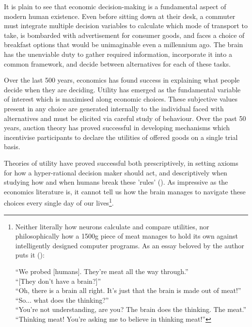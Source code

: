 
\begin{motivation}
It is plain to see that economic decision-making is a fundamental aspect of modern human existence. Even before sitting down at their desk, a commuter must integrate multiple decision variables to calculate which mode of transport to take, is bombarded with advertisement for consumer goods, and faces a choice of breakfast options that would be unimaginable even a millennium ago. The brain has the unenviable duty to gather required information, incorporate it into a common framework, and decide between alternatives for each of these tasks.

Over the last 500 years, economics has found success in explaining what people decide when they are deciding. Utility has emerged as the fundamental variable of interest which is maximised along economic choices. These subjective values present in any choice are generated internally to the individual faced with alternatives and must be elicited via careful study of behaviour. Over the past 50 years, auction theory has proved successful in developing mechanisms which incentivise participants to declare the utilities of offered goods on a single trial basis.

Theories of utility have proved successful both prescriptively, in setting axioms for how a hyper-rational decision maker should act, and descriptively when studying how and when humans break these 'rules' (\cite{luce2000utility}). As impressive as the economics literature is, it cannot tell us how the brain manages to navigate these choices every single day of our lives\footnote{Neither literally how neurons calculate and compare utilities, nor philosophically how a 1500g piece of meat manages to hold its own against intelligently designed computer programs. As an essay beloved by the author puts it (\cite{bisson1991theyre}):

``We probed [humans]. They're meat all the way through.''\\
``[They don't have a brain?]''\\
``Oh, there is a brain all right. It's just that the brain is made out of meat!''\\
``So... what does the thinking?''\\
``You're not understanding, are you? The brain does the thinking. The meat.''\\
``Thinking meat! You're asking me to believe in thinking meat!''}.



\end{motivation}
